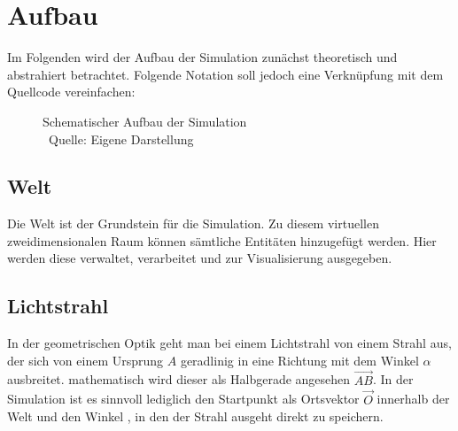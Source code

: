 \chapter{Aufbau}
Im Folgenden wird der Aufbau der Simulation zunächst theoretisch und abstrahiert betrachtet. 
Folgende Notation soll jedoch eine Verknüpfung mit dem Quellcode vereinfachen: 
\begin{figure}
    \centering
    \caption{Schematischer Aufbau der Simulation \\ Quelle: Eigene Darstellung}
    \label{m1}
\end{figure}

\section{Welt}
Die Welt  ist der Grundstein für die Simulation. 
Zu diesem virtuellen zweidimensionalen Raum können sämtliche Entitäten hinzugefügt werden. 
Hier werden diese verwaltet, verarbeitet und zur Visualisierung ausgegeben. 

\section{Lichtstrahl}
In der geometrischen Optik geht man bei einem Lichtstrahl  
von einem Strahl aus, der sich von einem Ursprung $ A $  
geradlinig in eine Richtung mit dem Winkel 
$ \alpha $ ausbreitet. \parencite[vgl.][S. 1041]{tipler2015physik} mathematisch 
wird dieser als Halbgerade angesehen $ \overrightarrow{AB} $. 
In der Simulation ist es sinnvoll lediglich den Startpunkt als Ortsvektor $ \vec{O} $  innerhalb der Welt
und den Winkel , in den der Strahl ausgeht direkt zu speichern. 

